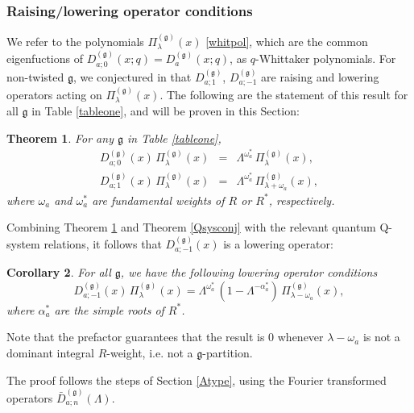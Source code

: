 \documentclass[12pt]{amsart}
\newtheorem{thm}{Theorem}[section]
\newtheorem{cor}[thm]{Corollary}
\newcommand{\g}{{\mathfrak{g}}}
\newcommand{\al}{{\alpha}}
\newcommand{\lL}{{\Lambda}}
\numberwithin{equation}{section}
\begin{document}
%
%
%
%
%




\subsubsection{Raising/lowering operator conditions}

We refer to the polynomials $\Pi^{(\g)}_\lambda(x)$ \eqref{whitpol}, which are the common eigenfuctions of
$D_{a;0}^{(\g)}(x;q)=D_{a}^{(\g)}(x;q)$, as $q$-Whittaker polynomials.
For non-twisted $\g$, we conjectured in \cite{DFKconj} that $D_{a;1}^{(\g)}$, $D_{a;-1}^{(\g)}$ are raising and lowering operators acting on $\Pi_\lambda^{(\g)}(x)$. The following are the statement of this result for all $\g$ in Table \ref{tableone}, and will be proven in this Section:
\begin{thm}\label{raiseconj}
For any $\g$ in Table \ref{tableone}, 
%
\begin{eqnarray}
D_{a;0}^{(\g)}(x)\, \Pi_\lambda^{(\g)}(x)&=&\lL^{\omega_a^*}\,\Pi_\lambda^{(\g)}(x)\label{eigenD},\\
D_{a;1}^{(\g)}(x)\, \Pi_\lambda^{(\g)}(x)&=& \lL^{\omega_a^*}\, \Pi_{\lambda+\omega_a}^{(\g)}(x),
\label{raiseD}
\end{eqnarray}
where $\omega_a$ and $\omega_a^*$ are fundamental weights of $R$ or $R^*$, respectively.
%
\end{thm}

Combining Theorem \ref{raiseconj} and Theorem \ref{Qsysconj} with the relevant quantum Q-system relations, it follows that $D_{a;-1}^{(\g)}(x)$ is a lowering operator:
\begin{cor}\label{lowerconj}
For all $\g$, we have the following lowering operator conditions
\begin{equation}\label{lowerD}
D_{a;-1}^{(\g)}(x)\, \Pi_\lambda^{(\g)}(x)=\lL^{\omega_a^*}\,(1-\lL^{-\al_a^*})\, \Pi_{\lambda-\omega_a}^{(\g)}(x),\end{equation}
where $\al_a^*$ are the simple roots of $R^*$.
%
\end{cor}
\noindent Note that the prefactor guarantees that the result is $0$ whenever $\lambda-\omega_a$ is not a dominant integral $R$-weight, i.e. not a $\g$-partition.

The proof follows the steps of Section \ref{Atype}, using the Fourier transformed operators $\bar D_{a;n}^{(\g)}(\lL)$.

%
%
%
%
%
%
%
%
%
%
%
%
%
%
%
%
%
%
%
%
%
%
%

%
%
%
\end{document}
